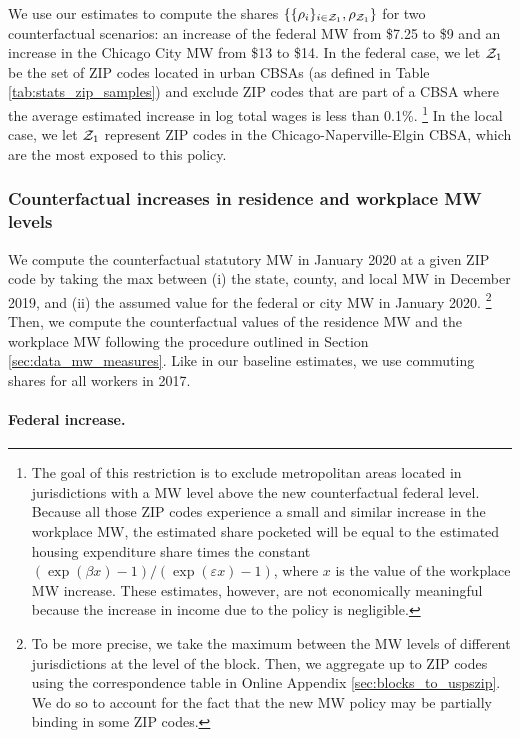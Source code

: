 We use our estimates to compute the shares 
$\{\{\rho_i\}_{i\in\mathcal{Z}_1},\rho_{\mathcal{Z}_1}\}$ for two counterfactual scenarios:
an increase of the federal MW from \$7.25 to \$9 and 
an increase in the Chicago City MW from \$13 to \$14.
In the federal case, we let $\mathcal{Z}_1$ be the set of ZIP codes located in urban 
CBSAs (as defined in Table \ref{tab:stats_zip_samples}) and exclude ZIP codes 
that are part of a CBSA where the average estimated increase in log total wages 
is less than 0.1\%.%
\footnote{\label{foot:restriction_on_zipcodes}
The goal of this restriction is to exclude metropolitan areas located 
in jurisdictions with a MW level above the new counterfactual federal level.
Because all those ZIP codes experience a small and similar increase in the 
workplace MW, the estimated share pocketed will be equal to the estimated
housing expenditure share times the constant 
$\left(\exp(\beta x)-1\right)/\left(\exp(\varepsilon x)-1\right)$,
where $x$ is the value of the workplace MW increase.
These estimates, however, are not economically meaningful because the increase
in income due to the policy is negligible.}
In the local case, we let $\mathcal{Z}_1$ represent ZIP codes in the 
Chicago-Naperville-Elgin CBSA, which are the most exposed to this policy.

\subsubsection{Counterfactual increases in residence and workplace MW levels}
\label{sec:cf_res_and_wkp_changes}

We compute the counterfactual statutory MW in January 2020 at a given ZIP code 
by taking the max between (i) the state, county, and local MW in December 2019, 
and (ii) the assumed value for the federal or city MW in January 2020.%
\footnote{To be more precise, we take the maximum between the MW levels of 
different jurisdictions at the level of the block.
Then, we aggregate up to ZIP codes using the correspondence table in 
Online Appendix \ref{sec:blocks_to_uspszip}.
We do so to account for the fact that the new MW policy may be partially 
binding in some ZIP codes.}
Then, we compute the counterfactual values of the residence MW and the workplace
MW following the procedure outlined in Section \ref{sec:data_mw_measures}.
Like in our baseline estimates, we use commuting shares for all workers in 2017.

\paragraph{Federal increase.}


